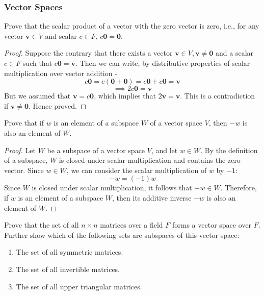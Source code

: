 \documentclass[openany]{book}
\begin{document}
\subsubsection{Vector Spaces}
\begin{exercise}
Prove that the scalar product of a vector with the zero vector is zero, i.e., for any vector $\mathbf{v} \in V$ and scalar $c \in F$, $c\mathbf{0} = \mathbf{0}$.
\end{exercise}
\begin{proof}
    Suppose the contrary that there exists a vector $\mathbf{v} \in V, \mathbf{v} \neq \mathbf{0}$ and a scalar $c \in F$ such that $c\mathbf{0} = \mathbf{v}$.
    Then we can write, by distributive properties of scalar multiplication over vector addition - 
    $$c\mathbf{0} = c(\mathbf{0} + \mathbf{0}) = c\mathbf{0} + c\mathbf{0} = \mathbf{v}$$
    $$\implies 2c\mathbf{0} = \mathbf{v}$$
    But we assumed that $\mathbf{v} = c\mathbf{0}$, which implies that $2\mathbf{v} = \mathbf{v}$. This is a contradiction if $\mathbf{v} \neq \mathbf{0}$.
    Hence proved. 
\end{proof}
\begin{exercise}
    Prove that if $w$ is an element of a subspace $W$ of a vector space $V$, then $-w$ is also an element of $W$.
\end{exercise}
\begin{proof}
    Let $W$ be a subspace of a vector space $V$, and let $w \in W$. By the definition of a subspace, $W$ is closed under scalar multiplication and contains the zero vector. Since $w \in W$, we can consider the scalar multiplication of $w$ by $-1$:
    $$ -w = (-1)w $$
    Since $W$ is closed under scalar multiplication, it follows that $-w \in W$. Therefore, if $w$ is an element of a subspace $W$, then its additive inverse $-w$ is also an element of $W$.
\end{proof}
\begin{exercise}
    Prove that the set of all $n \times n$ matrices over a field $F$ forms a vector space over $F$. Further show which of the following sets are subspaces of this vector space:
    \begin{enumerate}
        \item The set of all symmetric matrices.
        \item The set of all invertible matrices.
        \item The set of all upper triangular matrices.
    \end{enumerate}
\end{exercise}
\end{document}
